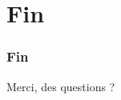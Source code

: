 \documentclass[compress]{beamer}%
\begin{document}
\section*{Fin}

\begin{frame}
	\frametitle{Fin}
	\begin{center}
		\huge
		Merci, des questions ?
	\end{center}
\end{frame}
\end{document}

